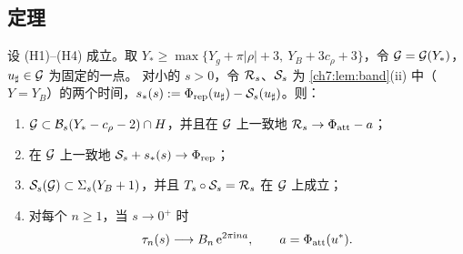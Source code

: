 \subsection{定理}

\begin{theorem}[汇流]\label{thm:confluence}
设 (H1)--(H4) 成立。取 $Y_*\ge\max\{Y_g+\pi|\rho|+3,\ Y_B+3c_\rho+3\}$，令 $\mathcal G=\mathcal G(Y_*)$，$u_\sharp\in\mathcal G$ 为固定的一点。
对小的 $s>0$，令 $\mathcal R_s$、$\mathcal S_s$ 为 \cref{ch7:lem:band}(ii) 中（$Y=Y_B$）的两个时间，$s_*(s):=\Phi_{\mathrm{rep}}(u_\sharp)-\mathcal S_s(u_\sharp)$。则：
\begin{enumerate}
\item $\mathcal G\subset\mathcal B_s(Y_*-c_\rho-2)\cap H$，并且在 $\mathcal G$ 上一致地 $\mathcal R_s\to\Phi_{\mathrm{att}}-a$；
\item 在 $\mathcal G$ 上一致地 $\mathcal S_s+s_*(s)\to\Phi_{\mathrm{rep}}$；
\item $\mathcal S_s(\mathcal G)\subset\Sigma_s(Y_B+1)$，并且 $T_s\circ\mathcal S_s=\mathcal R_s$ 在 $\mathcal G$ 上成立；
\item 对每个 $n\ge1$，当 $s\to0^+$ 时
  \[
   \tau_n(s)\longrightarrow B_n\,\mathrm{e}^{2\pi\mathrm{i} na},\qquad a=\Phi_{\mathrm{att}}(u^{*}).
  \]
\end{enumerate}
\end{theorem}

